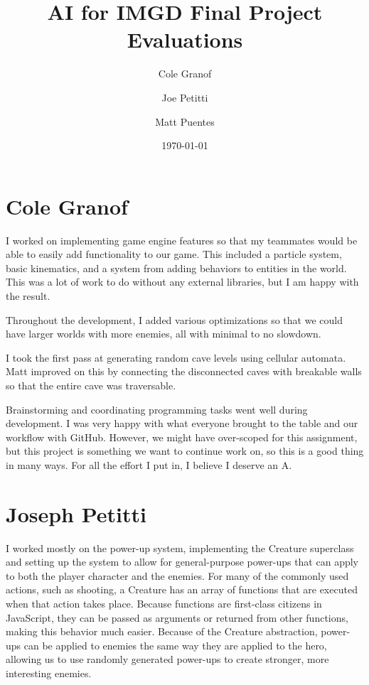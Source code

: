 \documentclass[a4paper, 12pt]{article}
\title{AI for IMGD Final Project Evaluations}
\author{Cole Granof \and Joe Petitti \and Matt Puentes}
\date{\today}
\begin{document}
\maketitle

\section{Cole Granof}

I worked on implementing game engine features so that my teammates would be able
to easily add functionality to our game. This included a particle system, basic
kinematics, and a system from adding behaviors to entities in the world. This
was a lot of work to do without any external libraries, but I am happy with the
result.

Throughout the development, I added various optimizations so that we could have
larger worlds with more enemies, all with minimal to no slowdown.

I took the first pass at generating random cave levels using cellular automata.
Matt improved on this by connecting the disconnected caves with breakable walls
so that the entire cave was traversable.

Brainstorming and coordinating programming tasks went well during development. I
was very happy with what everyone brought to the table and our workflow with
GitHub. However, we might have over-scoped for this assignment, but this project
is something we want to continue work on, so this is a good thing in many ways.
For all the effort I put in, I believe I deserve an A.

\section{Joseph Petitti}

I worked mostly on the power-up system, implementing the Creature superclass and
setting up the system to allow for general-purpose power-ups that can apply to
both the player character and the enemies. For many of the commonly used
actions, such as shooting, a Creature has an array of functions that are
executed when that action takes place. Because functions are first-class
citizens in JavaScript, they can be passed as arguments or returned from
other functions, making this behavior much easier. Because of the Creature
abstraction, power-ups can be applied to enemies the same way they are applied
to the hero, allowing us to use randomly generated power-ups to create stronger,
more interesting enemies.
\end{document}
